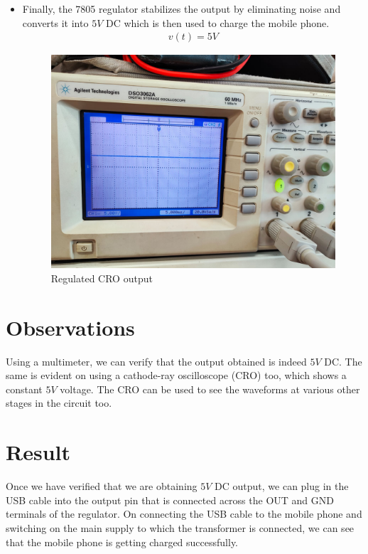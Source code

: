 \documentclass[journal,12pt,twocolumn]{IEEEtran}
\begin{document}
\begin{itemize}
	\item Finally, the 7805 regulator stabilizes the output by eliminating noise and converts it into $5 V$ DC which is then used to charge the mobile phone.
	\begin{align}
		v(t) = 5 V 
	\end{align}
	\begin{figure}[!ht]
		\centering
		\includegraphics[width=\columnwidth]{./figs/regulator.jpeg}
		\caption{Regulated CRO output}
		\label{fig-regulator}	
	\end{figure}
	\end{itemize}
	
	\section{Observations}
	Using a multimeter, we can verify that the output obtained is indeed $5 V$ DC. The same is evident on using a cathode-ray oscilloscope (CRO) too, which shows a constant $5 V$ voltage. The CRO can be used to see the waveforms at various other stages in the circuit too.
	
	\section{Result}	
	Once we have verified that we are obtaining $5 V$ DC output, we can plug in the USB cable into the output pin that is connected across the OUT and GND terminals of the regulator. On connecting the USB cable to the mobile phone and switching on the main supply to which the transformer is connected, we can see that the mobile phone is getting charged successfully.
	
	
\end{document}
